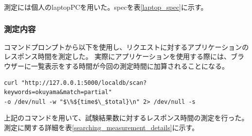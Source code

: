 測定には個人のlaptopPCを用いた。specを表\ref{laptop_spec}に示す。

\begin{table}[tbp]
\caption[laptopの性能]{laptopの性能}
\label{laptop_spec}
\end{table}


\subsubsection{測定内容}

コマンドプロンプトから以下を使用し、リクエストに対するアプリケーションのレスポンス時間を測定した。
実際にアプリケーションを使用する際には、ブラウザーに一覧表示をする時間が今回の測定時間に加算されることになる。

\begin{lstlisting}
curl "http://127.0.0.1:5000/localdb/scan?keywords=okuyama&match=partial" 
-o /dev/null -w "$\%${time$\_$total}\n" 2> /dev/null -s
\end{lstlisting}

上記のコマンドを用いて、試験結果数に対するレスポンス時間の測定を行った。
測定に関する詳細を表\ref{searching_measurement_details}に示す。

\begin{table}[tbp]
\begin{center}
\caption[検索機能処理時間測定の詳細]{検索機能処理時間測定の詳細}
\label{searching_measurement_details}
\end{center}
\end{table}


